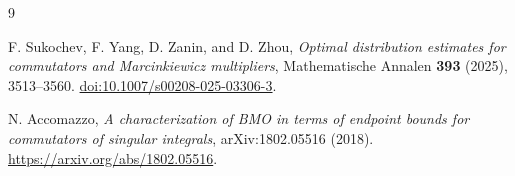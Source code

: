 \documentclass[UTF8,fontset=fandol,a4paper,11pt]{ctexart}
\begin{document}
\begin{thebibliography}{9}

F. Sukochev, F. Yang, D. Zanin, and D. Zhou,
\emph{Optimal distribution estimates for commutators and
Marcinkiewicz multipliers},
Mathematische Annalen \textbf{393} (2025), 3513--3560.
\href{https://doi.org/10.1007/s00208-025-03306-3}
{doi:10.1007/s00208-025-03306-3}.

N. Accomazzo,
\emph{A characterization of BMO in terms of endpoint bounds for
commutators of singular integrals},
arXiv:1802.05516 (2018).
\url{https://arxiv.org/abs/1802.05516}.

\end{thebibliography}
\end{document}
